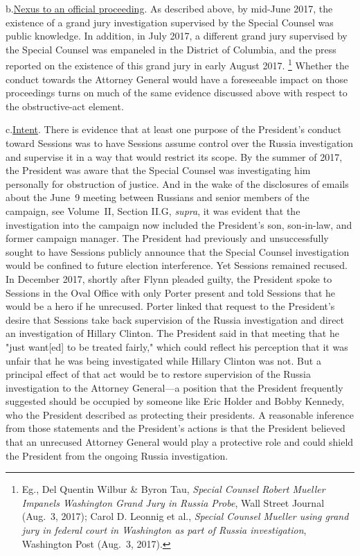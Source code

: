 b.\qquad\underline{Nexus to an official proceeding}.
As described above, by mid-June 2017, the existence of a grand jury investigation supervised by the Special Counsel was public knowledge.
In addition, in July 2017, a different grand jury supervised by the Special Counsel was empaneled in the District of Columbia, and the press reported on the existence of this grand jury in early August 2017.%
\footnote{Eg., Del Quentin Wilbur \& Byron Tau, \textit{Special Counsel Robert Mueller Impanels Washington Grand Jury in Russia Probe}, Wall Street Journal (Aug.~3, 2017);
Carol D. Leonnig et al., \textit{Special Counsel Mueller using grand jury in federal court in Washington as part of Russia investigation}, Washington Post (Aug.~3, 2017).}
Whether the conduct towards the Attorney General would have a foreseeable impact on those proceedings turns on much of the same evidence discussed above with respect to the obstructive-act element.

c.\qquad\underline{Intent}.
There is evidence that at least one purpose of the President's conduct toward Sessions was to have Sessions assume control over the Russia investigation and supervise it in a way that would restrict its scope.
By the summer of 2017, the President was aware that the Special Counsel was investigating him personally for obstruction of justice.
And in the wake of the disclosures of emails about the June~9 meeting between Russians and senior members of the campaign, see Volume~II, Section II.G, \textit{supra}, it was evident that the investigation into the campaign now included the President's son, son-in-law, and former campaign manager.
The President had previously and unsuccessfully sought to have Sessions publicly announce that the Special Counsel investigation would be confined to future election interference.
Yet Sessions remained recused.
In December 2017, shortly after Flynn pleaded guilty, the President spoke to Sessions in the Oval Office with only Porter present and told Sessions that he would be a hero if he unrecused.
Porter linked that request to the President's desire that Sessions take back supervision of the Russia investigation and direct an investigation of Hillary Clinton.
The President said in that meeting that he "just want[ed] to be treated fairly," which could reflect his perception that it was unfair that he was being investigated while Hillary Clinton was not.
But a principal effect of that act would be to restore supervision of the Russia investigation to the
Attorney General---a position that the President frequently suggested should be occupied by someone like Eric Holder and Bobby Kennedy, who the President described as protecting their presidents.
A reasonable inference from those statements and the President's actions is that the President believed that an unrecused Attorney General would play a protective role and could shield the President from the ongoing Russia investigation.

